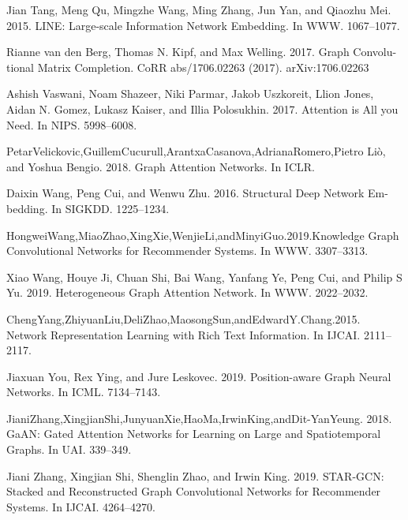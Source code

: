 \documentclass[conference]{IEEEtran}
\theoremstyle{theoremst}
\begin{document}
\begin{thebibliography}{00}
 Jian Tang, Meng Qu, Mingzhe Wang, Ming Zhang, Jun Yan, and Qiaozhu Mei.
2015. LINE: Large-scale Information Network Embedding. In WWW. 1067–1077.

 Rianne van den Berg, Thomas N. Kipf, and Max Welling. 2017. Graph Convolu-
tional Matrix Completion. CoRR abs/1706.02263 (2017). arXiv:1706.02263

 Ashish Vaswani, Noam Shazeer, Niki Parmar, Jakob Uszkoreit, Llion Jones, Aidan N. Gomez, Lukasz Kaiser, and Illia Polosukhin. 2017. Attention is All
you Need. In NIPS. 5998–6008.

 PetarVelickovic,GuillemCucurull,ArantxaCasanova,AdrianaRomero,Pietro
Liò, and Yoshua Bengio. 2018. Graph Attention Networks. In ICLR.

 Daixin Wang, Peng Cui, and Wenwu Zhu. 2016. Structural Deep Network Em-
bedding. In SIGKDD. 1225–1234.

 HongweiWang,MiaoZhao,XingXie,WenjieLi,andMinyiGuo.2019.Knowledge
Graph Convolutional Networks for Recommender Systems. In WWW. 3307–3313.

 Xiao Wang, Houye Ji, Chuan Shi, Bai Wang, Yanfang Ye, Peng Cui, and Philip S Yu. 2019. Heterogeneous Graph Attention Network. In WWW. 2022–2032.

 ChengYang,ZhiyuanLiu,DeliZhao,MaosongSun,andEdwardY.Chang.2015.
Network Representation Learning with Rich Text Information. In IJCAI. 2111–2117.

 Jiaxuan You, Rex Ying, and Jure Leskovec. 2019. Position-aware Graph Neural
Networks. In ICML. 7134–7143.

 JianiZhang,XingjianShi,JunyuanXie,HaoMa,IrwinKing,andDit-YanYeung.
2018. GaAN: Gated Attention Networks for Learning on Large and Spatiotemporal
Graphs. In UAI. 339–349.

 Jiani Zhang, Xingjian Shi, Shenglin Zhao, and Irwin King. 2019. STAR-GCN:
Stacked and Reconstructed Graph Convolutional Networks for Recommender Systems. In IJCAI. 4264–4270.

 
\end{thebibliography}
\vspace{12pt}
\end{document}
